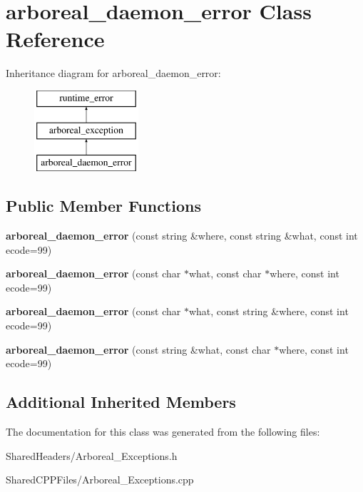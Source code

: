 \hypertarget{classarboreal__daemon__error}{}\section{arboreal\+\_\+daemon\+\_\+error Class Reference}
\label{classarboreal__daemon__error}
Inheritance diagram for arboreal\+\_\+daemon\+\_\+error\+:\begin{figure}[H]
\begin{center}
\leavevmode
\includegraphics[height=3.000000cm]{classarboreal__daemon__error}
\end{center}
\end{figure}
\subsection*{Public Member Functions}
\begin{DoxyCompactItemize}
\item 
\mbox{\label{classarboreal__daemon__error_aaa483ea710b1c20f37a61b7be7cd64fd}} 
{\bfseries arboreal\+\_\+daemon\+\_\+error} (const string \&where, const string \&what, const int ecode=99)
\item 
\mbox{\label{classarboreal__daemon__error_a4a8b88442bf94bf88ffa162c8e8f76ef}} 
{\bfseries arboreal\+\_\+daemon\+\_\+error} (const char $\ast$what, const char $\ast$where, const int ecode=99)
\item 
\mbox{\label{classarboreal__daemon__error_a32d6c4b31f97c709952f44e15fd6bf8a}} 
{\bfseries arboreal\+\_\+daemon\+\_\+error} (const char $\ast$what, const string \&where, const int ecode=99)
\item 
\mbox{\label{classarboreal__daemon__error_adc8e08526e65a9707c55b674c8d02044}} 
{\bfseries arboreal\+\_\+daemon\+\_\+error} (const string \&what, const char $\ast$where, const int ecode=99)
\end{DoxyCompactItemize}
\subsection*{Additional Inherited Members}


The documentation for this class was generated from the following files\+:\begin{DoxyCompactItemize}
\item 
Shared\+Headers/Arboreal\+\_\+\+Exceptions.\+h\item 
Shared\+C\+P\+P\+Files/Arboreal\+\_\+\+Exceptions.\+cpp\end{DoxyCompactItemize}

